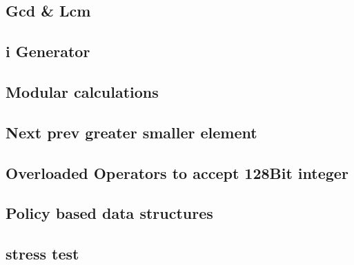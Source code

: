 \subsection{Gcd \& Lcm}
\raggedbottom
\hrulefill
\subsection{i Generator}
\raggedbottom
\hrulefill
\subsection{Modular calculations}
\raggedbottom
\hrulefill
\subsection{Next prev greater smaller element}
\raggedbottom
\hrulefill
\subsection{Overloaded Operators to accept 128Bit integer}
\raggedbottom
\hrulefill
\subsection{Policy based data structures}
\raggedbottom
\hrulefill
\subsection{stress test}
\raggedbottom
\hrulefill
